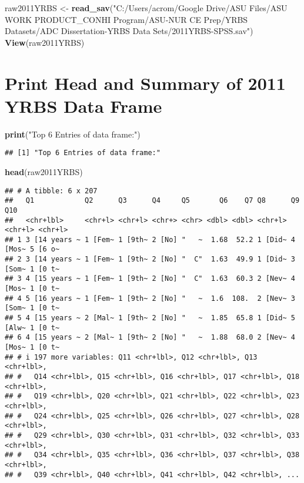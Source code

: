 \documentclass[
]{article}
\newenvironment{Shaded}{\begin{snugshade}}{\end{snugshade}}
\newcommand{\FunctionTok}[1]{\textcolor[rgb]{0.13,0.29,0.53}{\textbf{#1}}}
\newcommand{\NormalTok}[1]{#1}
\newcommand{\OtherTok}[1]{\textcolor[rgb]{0.56,0.35,0.01}{#1}}
\newcommand{\StringTok}[1]{\textcolor[rgb]{0.31,0.60,0.02}{#1}}
\begin{document}
\begin{Shaded}
\begin{Highlighting}[]
\NormalTok{raw2011YRBS }\OtherTok{\textless{}{-}} \FunctionTok{read\_sav}\NormalTok{(}\StringTok{"C:/Users/acrom/Google Drive/ASU Files/ASU WORK PRODUCT\_CONHI Program/ASU{-}NUR CE Prep/YRBS Datasets/ADC Dissertation{-}YRBS Data Sets/2011YRBS{-}SPSS.sav"}\NormalTok{)}
\FunctionTok{View}\NormalTok{(raw2011YRBS)}
\end{Highlighting}
\end{Shaded}

\hypertarget{print-head-and-summary-of-2011-yrbs-data-frame}{%
\section{Print Head and Summary of 2011 YRBS Data
Frame}\label{print-head-and-summary-of-2011-yrbs-data-frame}}

\begin{Shaded}
\begin{Highlighting}[]
\FunctionTok{print}\NormalTok{(}\StringTok{"Top 6 Entries of data frame:"}\NormalTok{)}
\end{Highlighting}
\end{Shaded}

\begin{verbatim}
## [1] "Top 6 Entries of data frame:"
\end{verbatim}

\begin{Shaded}
\begin{Highlighting}[]
\FunctionTok{head}\NormalTok{(raw2011YRBS)}
\end{Highlighting}
\end{Shaded}

\begin{verbatim}
## # A tibble: 6 x 207
##   Q1            Q2      Q3      Q4     Q5       Q6    Q7 Q8      Q9      Q10    
##   <chr+lbl>     <chr+l> <chr+l> <chr+> <chr> <dbl> <dbl> <chr+l> <chr+l> <chr+l>
## 1 3 [14 years ~ 1 [Fem~ 1 [9th~ 2 [No] "   ~  1.68  52.2 1 [Did~ 4 [Mos~ 5 [6 o~
## 2 3 [14 years ~ 1 [Fem~ 1 [9th~ 2 [No] "  C"  1.63  49.9 1 [Did~ 3 [Som~ 1 [0 t~
## 3 4 [15 years ~ 1 [Fem~ 1 [9th~ 2 [No] "  C"  1.63  60.3 2 [Nev~ 4 [Mos~ 1 [0 t~
## 4 5 [16 years ~ 1 [Fem~ 1 [9th~ 2 [No] "   ~  1.6  108.  2 [Nev~ 3 [Som~ 1 [0 t~
## 5 4 [15 years ~ 2 [Mal~ 1 [9th~ 2 [No] "   ~  1.85  65.8 1 [Did~ 5 [Alw~ 1 [0 t~
## 6 4 [15 years ~ 2 [Mal~ 1 [9th~ 2 [No] "   ~  1.88  68.0 2 [Nev~ 4 [Mos~ 1 [0 t~
## # i 197 more variables: Q11 <chr+lbl>, Q12 <chr+lbl>, Q13 <chr+lbl>,
## #   Q14 <chr+lbl>, Q15 <chr+lbl>, Q16 <chr+lbl>, Q17 <chr+lbl>, Q18 <chr+lbl>,
## #   Q19 <chr+lbl>, Q20 <chr+lbl>, Q21 <chr+lbl>, Q22 <chr+lbl>, Q23 <chr+lbl>,
## #   Q24 <chr+lbl>, Q25 <chr+lbl>, Q26 <chr+lbl>, Q27 <chr+lbl>, Q28 <chr+lbl>,
## #   Q29 <chr+lbl>, Q30 <chr+lbl>, Q31 <chr+lbl>, Q32 <chr+lbl>, Q33 <chr+lbl>,
## #   Q34 <chr+lbl>, Q35 <chr+lbl>, Q36 <chr+lbl>, Q37 <chr+lbl>, Q38 <chr+lbl>,
## #   Q39 <chr+lbl>, Q40 <chr+lbl>, Q41 <chr+lbl>, Q42 <chr+lbl>, ...
\end{verbatim}
\end{document}
